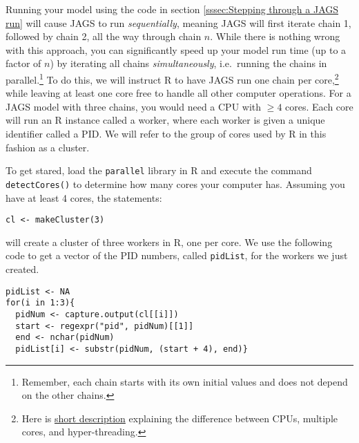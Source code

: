 \documentclass[12pt,english]{article}
\begin{document}
Running your model using the code in section \ref{sssec:Stepping through a JAGS run} will cause JAGS to run \emph{sequentially}, meaning JAGS will first iterate chain 1, followed by chain 2, all the way through chain $n$. While there is nothing wrong with this approach, you can significantly speed up your model run time (up to a factor of $n$) by iterating all chains \emph{simultaneously}, i.e.\ running the chains in parallel.\footnote{Remember, each chain starts with its own initial values and does not depend on the other chains.} To do this, we will instruct R to have JAGS run one chain per core,\footnote{Here is \href{http://www.howtogeek.com/194756/cpu-basics-multiple-cpus-cores-and-hyper-threading-explained/}{short description} explaining the difference between CPUs, multiple cores, and hyper-threading.} while leaving at least one core free to handle all other computer operations. For a JAGS model with three chains, you would need a CPU with $\geq 4$ cores. Each core will run an R instance called a worker, where each worker is given a unique identifier called a PID. We will refer to the group of cores used by R in this fashion as a cluster. 

To get stared, load the \texttt{parallel} library in R and execute the command \texttt{detectCores()} to determine how many cores your computer has. Assuming you have at least 4 cores, the statements:

\begin{Verbatim}
cl <- makeCluster(3)
\end{Verbatim}

\noindent will create a cluster of three workers in R, one per core. We use the following code to get a vector of the PID numbers, called  \texttt{pidList}, for the workers we just created. 

\begin{Verbatim}
pidList <- NA
for(i in 1:3){
  pidNum <- capture.output(cl[[i]])
  start <- regexpr("pid", pidNum)[[1]]
  end <- nchar(pidNum)
  pidList[i] <- substr(pidNum, (start + 4), end)}
\end{Verbatim}
\end{document}

